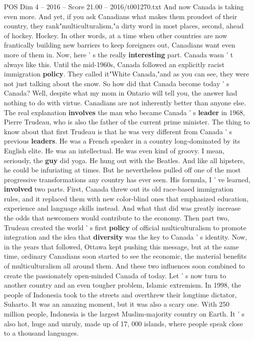 \begin{textsample}{POS Dim 4 – 2016 – Score 21.00 – 2016/t001270.txt}
And now Canada is taking even more.
And yet, if you ask Canadians what makes them proudest of their country, they rank"multiculturalism,"a dirty word in most places, second, ahead of hockey.
Hockey.
In other words, at a time when other countries are now frantically building new barriers to keep foreigners out, Canadians want even more of them in.
Now, here ' s the really \textbf{interesting} part.
Canada wasn ' t always like this.
Until the mid-1960s, Canada followed an explicitly racist immigration \textbf{policy}.
They called it"White Canada,"and as you can see, they were not just talking about the snow.
So how did that Canada become today ' s Canada?
Well, despite what my mom in Ontario will tell you, the answer had nothing to do with virtue.
Canadians are not inherently better than anyone else.
The real explanation \textbf{involves} the man who became Canada ' s \textbf{leader} in 1968, Pierre Trudeau, who is also the father of the current prime minister.
The thing to know about that first Trudeau is that he was very different from Canada ' s previous \textbf{leaders}.
He was a French speaker in a country long-dominated by its English elite.
He was an intellectual.
He was even kind of groovy.
I mean, seriously, the \textbf{guy} did yoga.
He hung out with the Beatles.
And like all hipsters, he could be infuriating at times.
But he nevertheless pulled off one of the most progressive transformations any country has ever seen.
His formula, I ' ve learned, \textbf{involved} two parts.
First, Canada threw out its old race-based immigration rules, and it replaced them with new color-blind ones that emphasized education, experience and language skills instead.
And what that did was greatly increase the odds that newcomers would contribute to the economy.
Then part two, Trudeau created the world ' s first \textbf{policy} of official multiculturalism to promote integration and the idea that \textbf{diversity} was the key to Canada ' s identity.
Now, in the years that followed, Ottawa kept pushing this message, but at the same time, ordinary Canadians soon started to see the economic, the material benefits of multiculturalism all around them.
And these two influences soon combined to create the passionately open-minded Canada of today.
Let ' s now turn to another country and an even tougher problem, Islamic extremism.
In 1998, the people of Indonesia took to the streets and overthrew their longtime dictator, Suharto.
It was an amazing moment, but it was also a scary one.
With 250 million people, Indonesia is the largest Muslim-majority country on Earth.
It ' s also hot, huge and unruly, made up of 17, 000 islands, where people speak close to a thousand languages.

\end{textsample}
